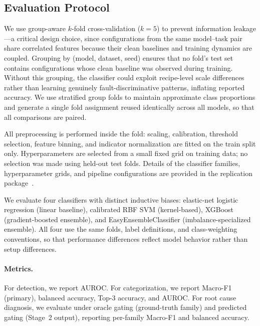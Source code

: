 \subsection{Evaluation Protocol}
\label{sec:defaultpp_cv}

We use group-aware $k$-fold cross-validation ($k=5$) to prevent information leakage---a critical design choice, since configurations from the same model--task pair share correlated features because their clean baselines and training dynamics are coupled. Grouping by (model, dataset, seed) ensures that no fold's test set contains configurations whose clean baseline was observed during training. Without this grouping, the classifier could exploit recipe-level scale differences rather than learning genuinely fault-discriminative patterns, inflating reported accuracy. We use stratified group folds to maintain approximate class proportions and generate a single fold assignment reused identically across all models, so that all comparisons are paired.

All preprocessing is performed inside the fold: scaling, calibration, threshold selection, feature binning, and indicator normalization are fitted on the train split only. Hyperparameters are selected from a small fixed grid on training data; no selection was made using held-out test folds. Details of the classifier families, hyperparameter grids, and pipeline configurations are provided in the replication package~\cite{defaultpp_repo}.

We evaluate four classifiers with distinct inductive biases: elastic-net logistic regression (linear baseline), calibrated RBF SVM (kernel-based), XGBoost (gradient-boosted ensemble), and EasyEnsembleClassifier (imbalance-specialized ensemble). All four use the same folds, label definitions, and class-weighting conventions, so that performance differences reflect model behavior rather than setup differences.

\paragraph{Metrics.}
For detection, we report AUROC. For categorization, we report Macro-F1 (primary), balanced accuracy, Top-3 accuracy, and AUROC. For root cause diagnosis, we evaluate under oracle gating (ground-truth family) and predicted gating (Stage~2 output), reporting per-family Macro-F1 and balanced accuracy.

